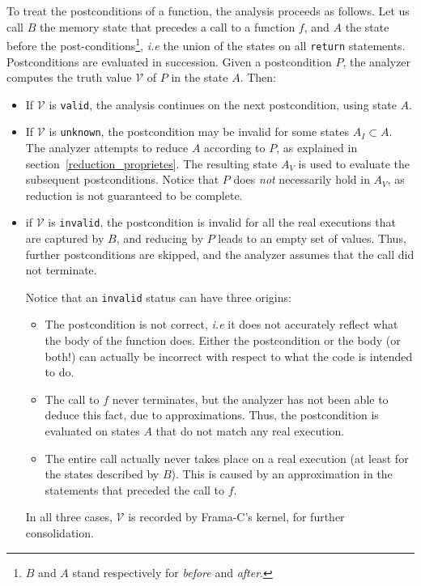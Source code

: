 \documentclass[web]{frama-c-book}
\begin{document}
To treat the postconditions of a function, the analysis proceeds as
follows.  Let us call $B$ the memory state that precedes a call to a
function $f$, and $A$ the state before the
post-conditions\footnote{$B$ and $A$ stand respectively for
  \emph{before} and \emph{after}.}, {\it i.e} the union of the states
on all \lstinline|return| statements. Postconditions are evaluated in
succession. Given a postcondition $P$, the analyzer computes
the truth value $\mathcal{V}$ of $P$ in the state $A$. %
Then:
\begin{itemize}
\item If $\mathcal{V}$ is \lstinline|valid|, the analysis continues on
  the next postcondition, using state $A$.

\item If $\mathcal{V}$ is \lstinline|unknown|, the postcondition may
  be invalid for some states $A_I \subset A$.  The analyzer attempts to reduce
  $A$ according to $P$, as explained in section~\ref{reduction_proprietes}.
  The resulting state $A_V$ is used to evaluate the subsequent postconditions.
  Notice that $P$ does \emph{not} necessarily hold in $A_V$, as reduction is not
  guaranteed to be complete.

\item if $\mathcal{V}$ is \lstinline|invalid|, the postcondition is
  invalid for all the real executions that are captured by
  $B$, and reducing by $P$ leads to an empty set of values. Thus,
  further postconditions are skipped, and the analyzer assumes
  that the call did not terminate.

Notice that an \lstinline|invalid| status can have three origins:
\begin{itemize}
\item The postcondition is not correct, {\it i.e} it does not accurately
  reflect what the body of the function does. Either
  the postcondition or the body (or both!) can actually be incorrect
  with respect to what the code is intended to do.

\item The call to $f$ never terminates, but the analyzer has not been
  able to deduce this fact, due to approximations. Thus, the
  postcondition is evaluated on states $A$ that do not match any real
  execution.

\item The entire call actually never takes place on a real
  execution (at least for the states described by $B$). This is
  caused by an approximation in the statements that preceded the
  call to $f$.
\end{itemize}

In all three cases, $\mathcal{V}$ is recorded by Frama-C's kernel, for
further consolidation.

\end{itemize}
\end{document}
